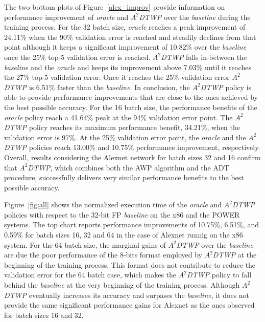 The two bottom plots of Figure~\ref{alex_improv} provide information on 
performance improvement of \textit{oracle} and \textit{$A^2$DTWP} over the 
\textit{baseline} during the training process.
For the 32 batch size, \textit{oracle} reaches a peak improvement of 24.11\% 
when the 90\%  validation error is reached and steadily declines from that point 
although it keeps a significant improvement of 10.82\% over the 
\textit{baseline} once the 25\% top-5 validation error is reached.  
\textit{$A^2$DTWP} falls in-between the \textit{baseline} and the 
\textit{oracle}  and keeps its improvement above 7.03\% until it reaches the 
27\% top-5 validation error.
Once it reaches the 25\% validation error \textit{$A^2$DTWP} is 6.51\% faster 
than the \textit{baseline}.
In conclusion, the \textit{$A^2$DTWP} policy is able to provide performance 
improvements that are close to the ones achieved by the best possible accuracy.
For the 16 batch size, the performance benefits of the \textit{oracle} policy 
reach a 41.64\% peak at the 94\% validation error point.
The \textit{$A^2$DTWP} policy reaches its maximum performance benefit, 34.21\%, 
when the validation error is 97\%.
At the 25\% validation error point, the \textit{oracle} and the 
\textit{$A^2$DTWP} policies reach 13.00\% and 10.75\% performance improvement, 
respectively.
Overall, results considering the Alexnet network for batch sizes 32 and 16 
confirm that \textit{$A^2$DTWP}, which combines both the AWP algorithm and the 
ADT procedure, successfully delivers very similar performance benefits to the 
best possible accuracy.

Figure~\ref{fig:all} shows the normalized execution time of the \textit{oracle} 
and \textit{$A^2$DTWP} policies with respect to the 32-bit FP \textit{baseline} 
on the x86 and the POWER systems.  The top chart reports performance 
improvements of 10.75\%, 6.51\%, and 0.59\% for batch sizes 16, 32 and 64 in
the case of Alexnet runnig on the x86 system.  For the 64 batch size, the 
marginal gains of \textit{$A^2$DTWP} over the \textit{baseline} are due the poor 
performance of the 8-bits format employed by \textit{$A^2$DTWP} at the beginning 
of the training process.
This format does not contribute to reduce the validation error for the 64 batch 
case, which makes the \textit{$A^2$DTWP} policy to fall behind the 
\textit{baseline} at the very beginning of the training process.  Although 
\textit{$A^2$DTWP} eventually increases its accuracy and surpases the 
\textit{baseline}, it does not provide the same significant performance gains 
for Alexnet as the ones observed for batch sizes 16 and 32.

